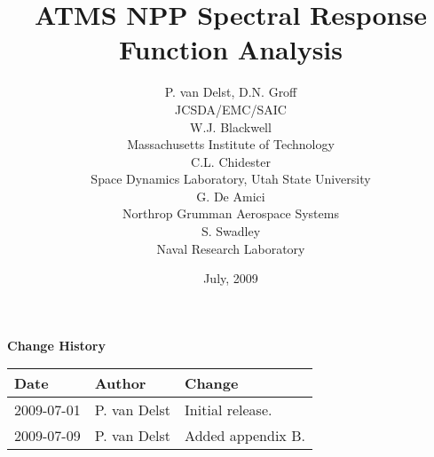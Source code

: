 



\newcommand{\frequency}[1]{\ensuremath{f_{#1}}}
\newcommand{\bfrequency}[1]{\boldmath\frequency{#1}\unboldmath}
\newcommand{\bdf}[1]{\boldmath\df{#1}\unboldmath}
\newcommand{\sideband}[1]{\ensuremath{df_{#1}}}
\newcommand{\bsideband}[1]{\boldmath\sideband{#1}\unboldmath}
\newcommand{\bdeltaf}{\boldmath\ensuremath{\Delta f}\unboldmath}
\newcommand{\up}[1]{\superscript{#1}}

\title{ATMS NPP Spectral Response Function Analysis}
\author{P. van Delst,
        D.N. Groff\\JCSDA/EMC/SAIC\\[0.25in]
        W.J. Blackwell\\Massachusetts Institute of Technology\\[0.25in]
        C.L. Chidester\\Space Dynamics Laboratory, Utah State University\\[0.25in]
        G. De Amici\\Northrop Grumman Aerospace Systems\\[0.25in]
        S. Swadley\\Naval Research Laboratory}
\date{July, 2009}



\maketitle

\draftwatermark

\thispagestyle{empty}
\vspace*{10cm}
\begin{center}
  {\sffamily\Large\bfseries Change History}
  \begin{table}[htp]
    \centering
    \begin{tabular}{|p{2cm}|p{3cm}|p{8cm}|}
      \hline
      \sffamily\textbf{Date} & \sffamily\textbf{Author} & \sffamily\textbf{Change}\\
      \hline\hline
      2009-07-01 & P. van Delst & Initial release.\\
      \hline
      2009-07-09 & P. van Delst & Added appendix B.\\
      \hline
    \end{tabular}
  \end{table}
\end{center}
\clearpage
{}
\setcounter{page}{1}



